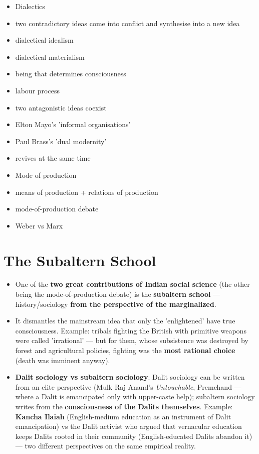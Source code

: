 \begin{QuickRevision}
\begin{itemize}
\item Dialectics
\item two contradictory ideas come into conflict and synthesise into a new idea
\item dialectical idealism
\item dialectical materialism
\item being that determines consciousness
\item labour process
\item two antagonistic ideas coexist
\item Elton Mayo's 'informal organisations'
\item Paul Brass's 'dual modernity'
\item revives at the same time
\item Mode of production
\item means of production + relations of production
\item mode-of-production debate
\item Weber vs Marx
\end{itemize}
\end{QuickRevision}

\section{The Subaltern School}

\begin{KeyConcept}
\begin{itemize}
\item One of the \textbf{two great contributions of Indian social science} (the other being the mode-of-production debate) is the \textbf{subaltern school} --- history/sociology \textbf{from the perspective of the marginalized}.
\item It dismantles the mainstream idea that only the 'enlightened' have true consciousness. Example: tribals fighting the British with primitive weapons were called 'irrational' --- but for them, whose subsistence was destroyed by forest and agricultural policies, fighting was the \textbf{most rational choice} (death was imminent anyway).
\item \textbf{Dalit sociology vs subaltern sociology}: Dalit sociology can be written from an elite perspective (Mulk Raj Anand's \emph{Untouchable}, Premchand --- where a Dalit is emancipated only with upper-caste help); subaltern sociology writes from the \textbf{consciousness of the Dalits themselves}. Example: \textbf{Kancha Ilaiah} (English-medium education as an instrument of Dalit emancipation) vs the Dalit activist who argued that vernacular education keeps Dalits rooted in their community (English-educated Dalits abandon it) --- two different perspectives on the same empirical reality.
\end{itemize}
\end{KeyConcept}

